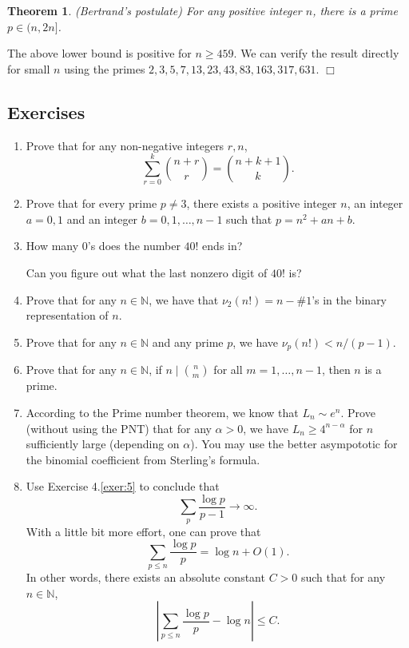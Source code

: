 \documentclass{article}
\def\N{{\mathbb N}}
\newtheorem{theorem}[subsection]{Theorem}
\newenvironment{proof}{\noindent {\bf Proof:}}{$\Box$ \vspace{2 ex}}
\begin{document}
\begin{theorem}
    (Bertrand's postulate) For any positive integer $n$, there is a prime $p \in (n, 2n]$.
\end{theorem}

\begin{proof}
    The above lower bound is positive for $n\geq 459$. We can verify the result directly for small $n$ using the primes $2,3,5,7,13,23,43,83,163,317,631$.
\end{proof}

\subsection*{Exercises}
\begin{enumerate}[\thesection .1]
    \item Prove that for any non-negative integers $r,n$, $$\sum_{r=0}^k\binom{n+r}{r} = \binom{n+k+1}{k}.$$
    \item Prove that for every prime $p \neq 3$, there exists a positive integer $n$, an integer $a = 0,1$ and an integer $b = 0,1,\ldots,n-1$ such that $p = n^2 + an + b$.
    \item How many $0$'s does the number $40!$ ends in? 
    
    Can you figure out what the last nonzero digit of $40!$ is?
    \item Prove that for any $n\in\N$, we have that $\nu_2(n!) = n - \#1$'s in the binary representation of $n$.
    \item Prove that for any $n\in\N$ and any prime $p$, we have $\nu_p(n!) < n/(p-1).$\label{exer:5}
    \item Prove that for any $n\in\N$, if $n\mid\binom{n}{m}$ for all $m = 1,\ldots,n-1$, then $n$ is a prime.
    \item According to the Prime number theorem, we know that $L_n\sim e^n$. Prove (without using the PNT) that for any $\alpha > 0$, we have $L_n \geq 4^{n-\alpha}$ for $n$ sufficiently large (depending on $\alpha$). You may use the better asympototic for the binomial coefficient from Sterling's formula.
    \item Use Exercise 4.\ref{exer:5} to conclude that $$\sum_{p}\frac{\log p}{p-1}\rightarrow\infty.$$
    With a little bit more effort, one can prove that $$\sum_{p\leq n}\frac{\log p}{p} = \log n + O(1).$$
    In other words, there exists an absolute constant $C>0$ such that for any $n\in\N$, $$\left|\sum_{p\leq n}\frac{\log p}{p} - \log n\right| \leq C.$$
\end{enumerate}
\end{document}

